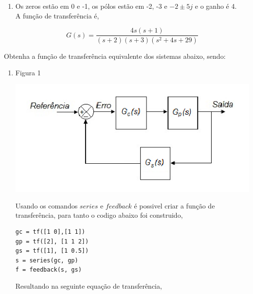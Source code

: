\documentclass[a4paper, 10pt]{article}
\begin{document}
\begin{list}{\textbf{Questão .}}{
\setlength{\labelwidth}{-2mm} \setlength{\parsep}{0mm}
\setlength{\topsep}{0mm} \setlength{\leftmargin}{0mm}}
\begin{enumerate}
                 Usando o mesmo código usando no item a, a função de transferência fica,

                 $$
                 G(s) = \frac{s}{s^2 + 2 s + 5}
                 $$

                 

             \item
                 Os zeros estão em 0 e -1, os pólos estão em -2, -3 e 
                 $-2\pm5j$ e o ganho é 4.\\

                 A função de transferência é,

                 $$
                 G(s) = \frac{4 s (s+1)}{(s+2) (s+3) (s^2 + 4 s + 29)}
                 $$
                

        \end{enumerate}


\newpage
\item
    Obtenha a função de transferência equivalente dos sistemas abaixo, sendo:

    \begin{enumerate}
        \item
            Figura 1
            \begin{center}
            \includegraphics[scale=0.5]{fig5a.png}
            \end{center}

            Usando os comandos $series$ e $feedback$ é possivel criar a função
            de transferência, para tanto o codigo abaixo foi construido,

            \begin{lstlisting}
gc = tf([1 0],[1 1])
gp = tf([2], [1 1 2])
gs = tf([1], [1 0.5])
s = series(gc, gp)
f = feedback(s, gs)
             \end{lstlisting}

            Resultando na seguinte equação de transferência,


\end{enumerate}
\end{list}
\end{document}

